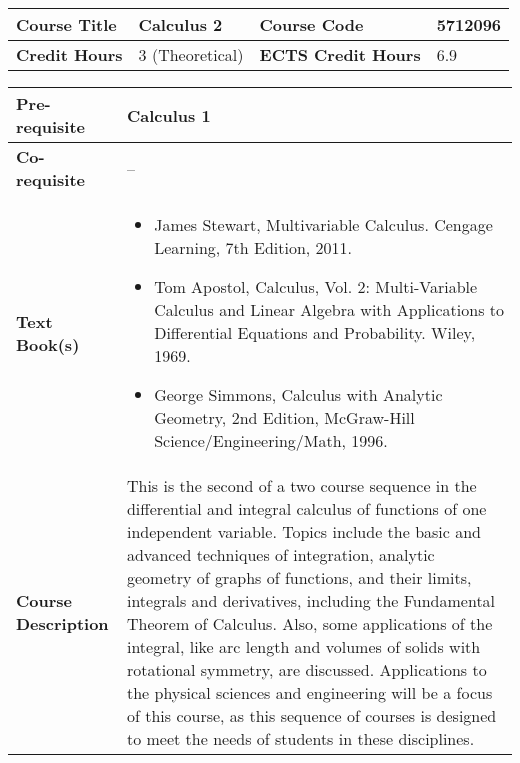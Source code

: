 \documentclass[12pt]{article}
\begin{document}
 \begin{minipage}{\textwidth}
\begin{tabularx}{\textwidth}{|l|X|l|X|}
\hline
\textbf{Course Title}       &   Calculus 2 & \textbf{Course Code}       &   5712096 \\ \hline
\textbf{Credit Hours}       &  3 (Theoretical) & \textbf{ECTS Credit Hours}       &  6.9 \\ \hline
\end{tabularx}

\begin{tabularx}{\textwidth}{|l|X|}
\hline
\textbf{Pre-requisite}      &  Calculus 1 \\ \hline
\textbf{Co-requisite}       &  -- \\ \hline
\textbf{Text Book(s)}      & \begin{minipage}{.70\textwidth}
					\begin{itemize} \itemsep-0.4em
						\vspace{3mm}
						\item James Stewart, Multivariable Calculus. Cengage Learning, 7th Edition, 2011.
						\item Tom Apostol, Calculus, Vol. 2: Multi-Variable Calculus and Linear Algebra with Applications to Differential Equations and Probability. Wiley, 1969.
						\item George Simmons, Calculus with Analytic Geometry, 2nd Edition, McGraw-Hill Science/Engineering/Math, 1996.
						\vspace{3mm}
					\end{itemize}
				\end{minipage}  \\ \hline
\textbf{Course Description} & \begin{minipage}{.70\textwidth}
					\vspace{3mm}
					
					This is the second of a two course sequence in the differential and integral calculus of functions of one independent variable. Topics include the basic and advanced techniques of integration, analytic geometry of graphs of functions, and their limits, integrals and derivatives, including the Fundamental Theorem of Calculus. Also, some applications of the integral, like arc length and volumes of solids with rotational symmetry, are discussed. Applications to the physical sciences and engineering will be a focus of this course, as this sequence of courses is designed to meet the needs of students in these disciplines.
					\newline
					

\end{minipage}
\end{tabularx}
\end{minipage}
\end{document}
